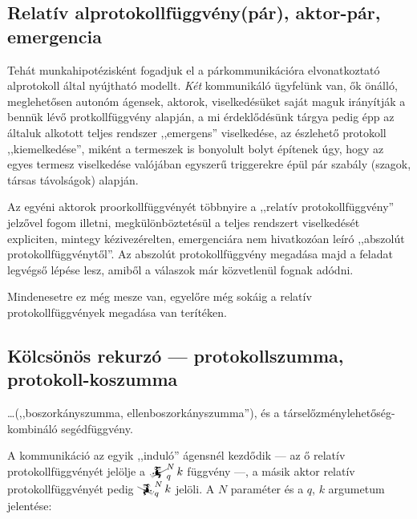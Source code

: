 \documentclass{article}
\newcommand{\mainfunA}[3]{\mathwitch_{#2}^{#1}#3}
\newcommand{\mainfunB}[3]{\reversemathwitch_{#2}^{#1}#3}
\begin{document}
	\subsection{Relatív alprotokollfüggvény(pár), aktor-pár, emergencia}

	Tehát munkahipotézisként fogadjuk el a párkommunikációra elvonatkoztató alprotokoll által nyújtható modellt. \emph{Két} kommunikáló ügyfelünk van, ők önálló, meglehetősen autonóm ágensek, aktorok, viselkedésüket saját maguk irányítják a bennük lévő protkollfüggvény alapján, a mi érdeklődésünk tárgya pedig épp az általuk alkotott teljes rendszer ,,emergens'' viselkedése, az észlehető protokoll ,,kiemelkedése'', miként a termeszek is bonyolult bolyt építenek úgy, hogy az egyes termesz viselkedése valójában egyszerű triggerekre épül pár szabály (szagok, társas távolságok) alapján.

	Az egyéni aktorok proorkollfüggvényét többnyire a ,,relatív protokollfüggvény'' jelzővel fogom illetni, megkülönböztetésül a teljes rendszert viselkedését expliciten, mintegy kézivezérelten, emergenciára nem hivatkozóan leíró ,,abszolút protokollfüggvénytől''. Az abszolút protokollfüggvény megadása majd a feladat legvégső lépése lesz, amiből a válaszok már közvetlenül fognak adódni.

	Mindenesetre ez még mesze van, egyelőre még sokáig a relatív protokollfüggvények megadása van terítéken.

	\subsection{Kölcsönös rekurzó --- protokollszumma, protokoll-koszumma}

	 \dots (,,boszorkányszumma, ellenboszorkányszumma''), és a társelőzménylehetőség-kombináló segédfüggvény.


	A kommunikáció az egyik ,,induló'' ágensnél kezdődik --- az ő relatív protokollfüggvényét jelölje a $\mainfunA Nqk$ függvény ---, a másik aktor relatív protokollfüggvényét pedig  $\mainfunB Nqk$ jelöli. A $N$ paraméter és a $q$, $k$ argumetum jelentése:
\end{document}
